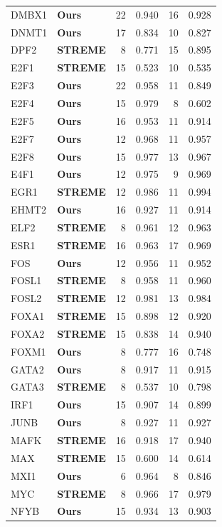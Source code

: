 \begin{table}[!ht]
\begin{tabular}{llrrrr}
DMBX1 & \textbf{Ours} & 22 & 0.940 & 16 & 0.928 \\
DNMT1 & \textbf{Ours} & 17 & 0.834 & 10 & 0.827 \\
DPF2 & \textbf{STREME} & 8 & 0.771 & 15 & 0.895 \\
E2F1 & \textbf{STREME} & 15 & 0.523 & 10 & 0.535 \\
E2F3 & \textbf{Ours} & 22 & 0.958 & 11 & 0.849 \\
E2F4 & \textbf{Ours} & 15 & 0.979 & 8 & 0.602 \\
E2F5 & \textbf{Ours} & 16 & 0.953 & 11 & 0.914 \\
E2F7 & \textbf{Ours} & 12 & 0.968 & 11 & 0.957 \\
E2F8 & \textbf{Ours} & 15 & 0.977 & 13 & 0.967 \\
E4F1 & \textbf{Ours} & 12 & 0.975 & 9 & 0.969 \\
EGR1 & \textbf{STREME} & 12 & 0.986 & 11 & 0.994 \\
EHMT2 & \textbf{Ours} & 16 & 0.927 & 11 & 0.914 \\
ELF2 & \textbf{STREME} & 8 & 0.961 & 12 & 0.963 \\
ESR1 & \textbf{STREME} & 16 & 0.963 & 17 & 0.969 \\
FOS & \textbf{Ours} & 12 & 0.956 & 11 & 0.952 \\
FOSL1 & \textbf{STREME} & 8 & 0.958 & 11 & 0.960 \\
FOSL2 & \textbf{STREME} & 12 & 0.981 & 13 & 0.984 \\
FOXA1 & \textbf{STREME} & 15 & 0.898 & 12 & 0.920 \\
FOXA2 & \textbf{STREME} & 15 & 0.838 & 14 & 0.940 \\
FOXM1 & \textbf{Ours} & 8 & 0.777 & 16 & 0.748 \\
GATA2 & \textbf{Ours} & 8 & 0.917 & 11 & 0.915 \\
GATA3 & \textbf{STREME} & 8 & 0.537 & 10 & 0.798 \\
IRF1 & \textbf{Ours} & 15 & 0.907 & 14 & 0.899 \\
JUNB & \textbf{Ours} & 8 & 0.927 & 11 & 0.927 \\
MAFK & \textbf{STREME} & 16 & 0.918 & 17 & 0.940 \\
MAX & \textbf{STREME} & 15 & 0.600 & 14 & 0.614 \\
MXI1 & \textbf{Ours} & 6 & 0.964 & 8 & 0.846 \\
MYC & \textbf{STREME} & 8 & 0.966 & 17 & 0.979 \\
NFYB & \textbf{Ours} & 15 & 0.934 & 13 & 0.903 \\

\end{tabular}
\end{table}
